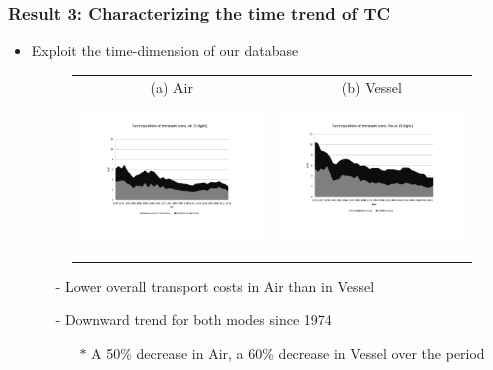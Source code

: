 \documentclass[10 pt,Helvetica, french]{beamer}
\begin{document}
\begin{frame}[label = slide_fig1]
\frametitle{Result 3: Characterizing the time trend of TC }
\begin{itemize}
\item Exploit the time-dimension of our database  \hyperlink{slide_result1}{} %
\begin{figure}[htbp]
\begin{center}
\begin{tabular}{cc}
{\scriptsize (a) Air } & {\scriptsize  (b) Vessel}\\
\includegraphics[width=5cm, height=4cm]{Fig2a_decompTC_air_3d.pdf}
& \includegraphics[width=5cm,height=4cm]{Fig2b_decompTC_vessel_3d.pdf} \\
\end{tabular}\end{center}
\end{figure}
\begin{itemize}
\item[-] Lower overall transport costs in Air than in Vessel \vspace{0.1cm}
\item[-] Downward trend for both modes since 1974 \vspace{0.1cm}
\begin{itemize}
\item[$\ast$] A 50\% decrease in Air, a 60\% decrease in Vessel over the period
\end{itemize}
\end{itemize}
\end{itemize}
\end{frame}
\end{document}
